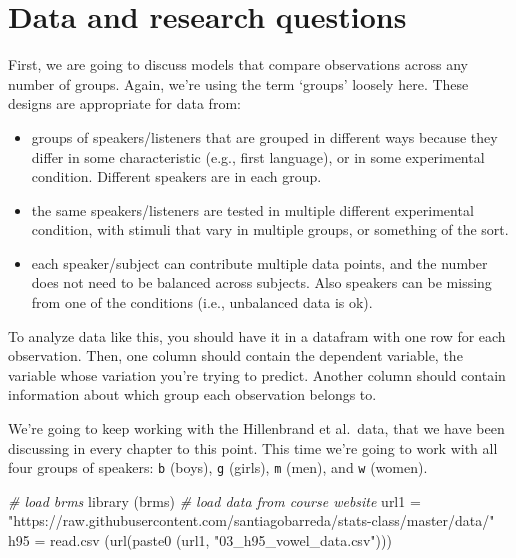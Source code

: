 \documentclass[
]{book}
\newenvironment{Shaded}{\begin{snugshade}}{\end{snugshade}}
\newcommand{\CommentTok}[1]{\textcolor[rgb]{0.56,0.35,0.01}{\textit{#1}}}
\newcommand{\FunctionTok}[1]{\textcolor[rgb]{0.00,0.00,0.00}{#1}}
\newcommand{\NormalTok}[1]{#1}
\newcommand{\OtherTok}[1]{\textcolor[rgb]{0.56,0.35,0.01}{#1}}
\newcommand{\StringTok}[1]{\textcolor[rgb]{0.31,0.60,0.02}{#1}}
\begin{document}
\hypertarget{data-and-research-questions-3}{%
\section{Data and research questions}\label{data-and-research-questions-3}}

First, we are going to discuss models that compare observations across any number of groups. Again, we're using the term `groups' loosely here. These designs are appropriate for data from:

\begin{itemize}
\item
  groups of speakers/listeners that are grouped in different ways because they differ in some characteristic (e.g., first language), or in some experimental condition. Different speakers are in each group.
\item
  the same speakers/listeners are tested in multiple different experimental condition, with stimuli that vary in multiple groups, or something of the sort.
\item
  each speaker/subject can contribute multiple data points, and the number does not need to be balanced across subjects. Also speakers can be missing from one of the conditions (i.e., unbalanced data is ok).
\end{itemize}

To analyze data like this, you should have it in a datafram with one row for each observation. Then, one column should contain the dependent variable, the variable whose variation you're trying to predict. Another column should contain information about which group each observation belongs to.

We're going to keep working with the Hillenbrand et al.~data, that we have been discussing in every chapter to this point. This time we're going to work with all four groups of speakers: \texttt{b} (boys), \texttt{g} (girls), \texttt{m} (men), and \texttt{w} (women).

\begin{Shaded}
\begin{Highlighting}[]
\CommentTok{\# load brms}
\FunctionTok{library}\NormalTok{ (brms)}
\CommentTok{\# load data from course website}
\NormalTok{url1 }\OtherTok{=} \StringTok{"https://raw.githubusercontent.com/santiagobarreda/stats{-}class/master/data/"}
\NormalTok{h95 }\OtherTok{=} \FunctionTok{read.csv}\NormalTok{ (}\FunctionTok{url}\NormalTok{(}\FunctionTok{paste0}\NormalTok{ (url1, }\StringTok{"03\_h95\_vowel\_data.csv"}\NormalTok{)))}
\end{Highlighting}
\end{Shaded}
\end{document}

